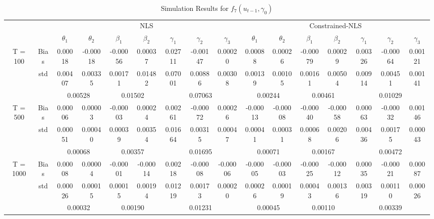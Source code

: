 \documentclass[a4paper,12pt,times,numbered,print,index]{report}
\numberwithin{equation}{section}
\begin{document}
\begin{table}[htbp]
  \centering
  \caption{Simulation Results for $f_7 (u_{t-1}, \gamma_0)$}
    \begin{adjustbox}{max width=\textwidth}
    \begin{tabular}{cccccccccccccccc}
    \toprule
          &       & \multicolumn{7}{c}{NLS}                               & \multicolumn{7}{c}{Constrained-NLS} \\
          &       & $\theta_1$ & $\theta_2$ & $\beta_1$ & $\beta_2$ & $\gamma_1$ & $\gamma_2$ & $\gamma_3$ & $\theta_1$ & $\theta_2$ & $\beta_1$ & $\beta_2$ & $\gamma_1$ & $\gamma_2$ & $\gamma_3$ \\
    \midrule
    \multirow{3}[1]{*}{T = 100} & Bias  & 0.00018 & -0.00018 & -0.00056 & 0.00037 & 0.02711 & -0.00147 & 0.00020 & 0.00088 & 0.00026 & -0.00079 & 0.00029 & 0.00326 & -0.00064 & 0.00121 \\
          & std   & 0.00407 & 0.00335 & 0.00171 & 0.01482 & 0.07001 & 0.00886 & 0.00308 & 0.00139 & 0.00105 & 0.00161 & 0.00504 & 0.00914 & 0.00451 & 0.00141 \\
          &       & \multicolumn{2}{c}{0.00528} & \multicolumn{2}{c}{0.01502} & \multicolumn{3}{c}{0.07063} & \multicolumn{2}{c}{0.00244} & \multicolumn{2}{c}{0.00461} & \multicolumn{3}{c}{0.01029} \\
    \multirow{3}[0]{*}{T = 500} & Bias  & 0.00006 & 0.00003 & -0.00003 & 0.00024 & 0.00261 & -0.00072 & 0.00026 & -0.00013 & -0.00008 & -0.00040 & -0.00058 & 0.00063 & -0.00032 & 0.00146 \\
          & std   & 0.00051 & 0.00040 & 0.00039 & 0.00354 & 0.01664 & 0.00315 & 0.00047 & 0.00041 & 0.00031 & 0.00068 & 0.00206 & 0.00436 & 0.00175 & 0.00043 \\
          &       & \multicolumn{2}{c}{0.00068} & \multicolumn{2}{c}{0.00357} & \multicolumn{3}{c}{0.01695} & \multicolumn{2}{c}{0.00071} & \multicolumn{2}{c}{0.00167} & \multicolumn{3}{c}{0.00472} \\
    \multirow{3}[1]{*}{T = 1000} & Bias  & 0.00008 & 0.00004 & -0.00001 & -0.00014 & 0.00218 & -0.00008 & -0.00006 & -0.00005 & -0.00003 & -0.00025 & -0.00012 & 0.00035 & -0.00021 & 0.00087 \\
          & std   & 0.00026 & 0.00015 & 0.00015 & 0.00194 & 0.01219 & 0.00173 & 0.00020 & 0.00026 & 0.00019 & 0.00043 & 0.00136 & 0.00319 & 0.00110 & 0.00026 \\
          &       & \multicolumn{2}{c}{0.00032} & \multicolumn{2}{c}{0.00190} & \multicolumn{3}{c}{0.01231} & \multicolumn{2}{c}{0.00045} & \multicolumn{2}{c}{0.00110} & \multicolumn{3}{c}{0.00339} \\
    \bottomrule
    \bottomrule
    \end{tabular}%
    \end{adjustbox}
  \label{s_f7}%
\end{table}%
\pagebreak
\end{document}
